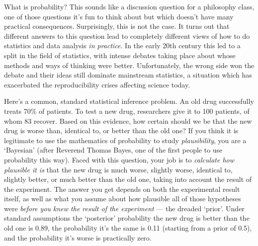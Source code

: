 \documentclass[a4paper, 12pt]{article}
\title{}
\author{Brendon J. Brewer}
\begin{document}
\sffamily
\maketitle

What is probability? This sounds like a discussion question for a
philosophy class, one of those questions it's fun to think about but which
doesn't have many practical consequences. Surprisingly, this is not the case.
It turns out that different answers to this question lead to completely
different views of how to do statistics and data analysis {\em in practice}.
In the early 20th century this led to a split in the field of statistics,
with intense debates taking place about whose methods and ways of thinking
were better. Unfortunately, the wrong side won the debate and their
ideas still dominate mainstream statistics, a situation which
has exacerbated the reproducibility crises affecting science today.

Here's a common, standard statistical inference problem. An old drug
successfully treats 70\% of patients. To test a new drug, researchers give it
to 100 patients, of whom 83 recover. Based on this evidence, how certain
should we be that the new drug is worse than, identical to, or better than the
old one? If you think it is legitimate to use the mathematics of probability
to study {\em plausibility}, you are a `Bayesian' (after Reverend
Thomas Bayes, one of the first people to use probability this way). Faced with
this question, your job is to {\em calculate how plausible it is} that the new
drug is much worse, slightly worse, identical to, slightly better, or much better
than the old one, taking into account the result of the experiment. The answer
you get
depends on both the experimental result itself, as well as what you assume
about how plausible all of those hypotheses were {\em before you knew the result
of the experiment} --- the dreaded `prior'.
Under standard assumptions the `posterior' probability the new drug is better
than the old one is 0.89, the probability it's the same is 0.11 (starting
from a prior of 0.5), and the
probability it's worse is practically zero.
\end{document}
